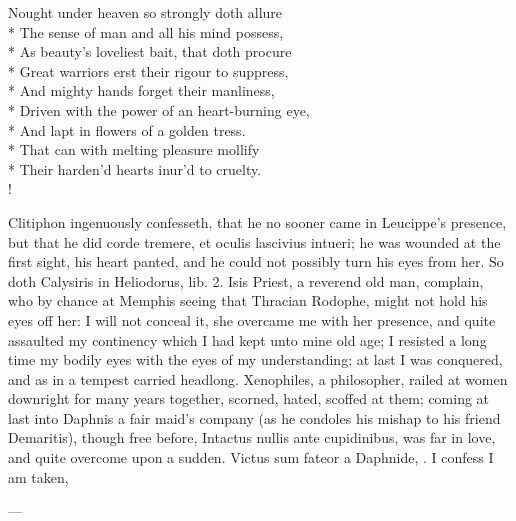 \begin{versewithlinenos}{2}{1}{1}
Nought under heaven so strongly doth allure\\*
The sense of man and all his mind possess,\\*
As beauty's loveliest bait, that doth procure\\*
Great warriors erst their rigour to suppress,\\*
And mighty hands forget their manliness,\\*
Driven with the power of an heart-burning eye,\\*
And lapt in flowers of a golden tress.\\*
That can with melting pleasure mollify\\*
Their harden'd hearts inur'd to cruelty.\\!
\end{versewithlinenos}%

Clitiphon ingenuously confesseth, that he no sooner came in
Leucippe's presence, but that he did corde tremere, et oculis lascivius
intueri; he was wounded at the first sight, his heart panted, and
he could not possibly turn his eyes from her. So doth Calysiris in
Heliodorus, lib. 2. Isis Priest, a reverend old man, complain, who by
chance at Memphis seeing that Thracian Rodophe, might not hold his eyes
off her: I will not conceal it, she overcame me with her
presence, and quite assaulted my continency which I had kept unto mine
old age; I resisted a long time my bodily eyes with the eyes of my
understanding; at last I was conquered, and as in a tempest carried
headlong.  Xenophiles, a philosopher, railed at women downright
for many years together, scorned, hated, scoffed at them; coming at
last into Daphnis a fair maid's company (as he condoles his mishap to
his friend Demaritis), though free before, Intactus nullis ante
cupidinibus, was far in love, and quite overcome upon a sudden. Victus
sum fateor a Daphnide, \etc{}. I confess I am taken,

---

